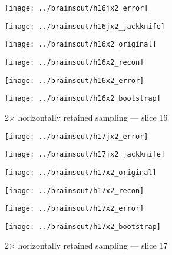 \documentclass[review,supplement,onefignum,onetabnum,juq]{siamonline181217}
\begin{document}
\begin{figure}
\begin{centering}

\parbox{\imsize}{\texttt{[image: ../brainsout/h16jx2\_error]}}
\parbox{\imsize}{\texttt{[image: ../brainsout/h16jx2\_jackknife]}}

\vspace{\vertsep}

\parbox{\imsize}{\texttt{[image: ../brainsout/h16x2\_original]}}
\parbox{\imsize}{\texttt{[image: ../brainsout/h16x2\_recon]}}

\vspace{\vertsep}

\parbox{\imsize}{\texttt{[image: ../brainsout/h16x2\_error]}}
\parbox{\imsize}{\texttt{[image: ../brainsout/h16x2\_bootstrap]}}

\end{centering}
\caption{2$\times$ horizontally retained sampling --- slice 16}
\end{figure}


\begin{figure}
\begin{centering}

\parbox{\imsize}{\texttt{[image: ../brainsout/h17jx2\_error]}}
\parbox{\imsize}{\texttt{[image: ../brainsout/h17jx2\_jackknife]}}

\vspace{\vertsep}

\parbox{\imsize}{\texttt{[image: ../brainsout/h17x2\_original]}}
\parbox{\imsize}{\texttt{[image: ../brainsout/h17x2\_recon]}}

\vspace{\vertsep}

\parbox{\imsize}{\texttt{[image: ../brainsout/h17x2\_error]}}
\parbox{\imsize}{\texttt{[image: ../brainsout/h17x2\_bootstrap]}}

\end{centering}
\caption{2$\times$ horizontally retained sampling --- slice 17}
\end{figure}
\end{document}
